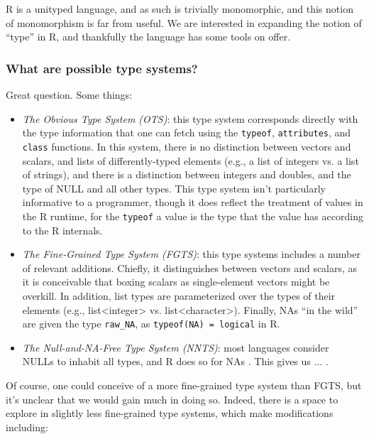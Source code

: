 \documentclass[acmsmall,10pt,review,anonymous]{acmart}\settopmatter{printfolios=true,printccs=false,printacmref=false}
\begin{document}
R is a unityped language, and as such is trivially monomorphic, and this notion of monomorphism is far from useful.
We are interested in expanding the notion of ``type'' in R, and thankfully the language has some tools on offer.

%
%
\subsubsection{What are possible type systems?}

Great question.
Some things:

\begin{itemize}

\item {\it The Obvious Type System (OTS)}: this type system corresponds directly with the type information that one can fetch using the {\tt typeof}, {\tt attributes}, and {\tt class} functions.
In this system, there is no distinction between vectors and scalars, and lists of differently-typed elements (e.g., a list of integers vs. a list of strings), and there is a distinction between integers and doubles, and the type of NULL and all other types.
This type system isn't particularly informative to a programmer, though it does reflect the treatment of values in the R runtime, for the {\tt typeof} a value is the type that the value has according to the R internals.

\item {\it The Fine-Grained Type System (FGTS)}: this type systems includes a number of relevant additions.
Chiefly, it distinguishes between vectors and scalars, as it is conceivable that boxing scalars as single-element vectors might be overkill.
In addition, list types are parameterized over the types of their elements (e.g., list<integer> vs. list<character>).
Finally, NAs ``in the wild'' are given the type {\tt raw\_NA}, as {\tt typeof(NA) = logical} in R.

\item {\it The Null-and-NA-Free Type System (NNTS)}: most languages consider NULLs to inhabit all types, and R does so for NAs .
This gives us ... .

\end{itemize}

Of course, one could conceive of a more fine-grained type system than FGTS, but it's unclear that we would gain much in doing so.
Indeed, there is a space to explore in slightly less fine-grained type systems, which make modifications including:
\end{document}
